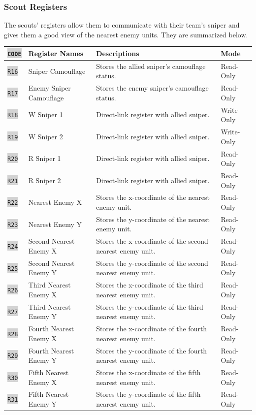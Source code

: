 \documentclass{article}
\newcommand{\vnscode}[1]{\colorbox{lightgray}{\lstinline[language=vns]{#1}}}
\begin{document}
\subsubsection{Scout Registers}

The scouts' registers allow them to communicate with their team's sniper and
gives them a good view of the nearest enemy units. They are summarized below.

\begin{minipage}{\textwidth}
\centering
\begin{tabular}{llll}
    \hline \vnscode{CODE} & Register Names & Descriptions & Mode \\ \hline
    \vnscode{R16} & Sniper Camouflage & Stores the allied sniper's camouflage status. & Read-Only \\
    \vnscode{R17} & Enemy Sniper Camouflage & Stores the enemy sniper's camouflage status. & Read-Only \\
    \vnscode{R18} & W Sniper 1 & Direct-link register with allied sniper. & Write-Only \\
    \vnscode{R19} & W Sniper 2 & Direct-link register with allied sniper. & Write-Only \\
    \vnscode{R20} & R Sniper 1 & Direct-link register with allied sniper. & Read-Only \\
    \vnscode{R21} & R Sniper 2 & Direct-link register with allied sniper. & Read-Only \\
    \vnscode{R22} & Nearest Enemy X & Stores the x-coordinate of the nearest enemy unit. & Read-Only \\
    \vnscode{R23} & Nearest Enemy Y & Stores the y-coordinate of the nearest enemy unit. & Read-Only \\
    \vnscode{R24} & Second Nearest Enemy X & Stores the x-coordinate of the second nearest enemy unit. & Read-Only \\
    \vnscode{R25} & Second Nearest Enemy Y & Stores the y-coordinate of the second nearest enemy unit. & Read-Only \\
    \vnscode{R26} & Third Nearest Enemy X & Stores the x-coordinate of the third nearest enemy unit. & Read-Only \\
    \vnscode{R27} & Third Nearest Enemy Y & Stores the y-coordinate of the third nearest enemy unit. & Read-Only \\
    \vnscode{R28} & Fourth Nearest Enemy X & Stores the x-coordinate of the fourth nearest enemy unit. & Read-Only \\
    \vnscode{R29} & Fourth Nearest Enemy Y & Stores the y-coordinate of the fourth nearest enemy unit. & Read-Only \\
    \vnscode{R30} & Fifth Nearest Enemy X & Stores the x-coordinate of the fifth nearest enemy unit. & Read-Only \\
    \vnscode{R31} & Fifth Nearest Enemy Y & Stores the y-coordinate of the fifth nearest enemy unit. & Read-Only \\
\end{tabular}
\end{minipage}
\end{document}
